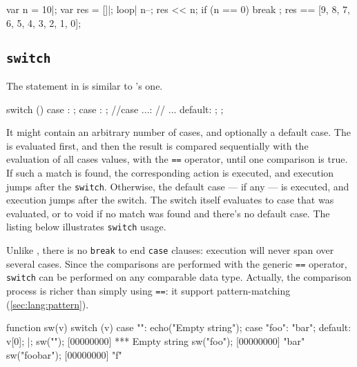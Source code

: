 \begin{urbiassert}
{
  var n = 10|;
  var res = []|;
  loop|
  {
    n--;
    res << n;
    if (n == 0)
      break
  };
  res
}
==
[9, 8, 7, 6, 5, 4, 3, 2, 1, 0];
\end{urbiassert}

\subsection{\lstinline{switch}}
\label{sec:lang:switch}

The  statement in \us is similar to \langC's one.

\begin{urbiunchecked}
switch ()
{
  case :
    ;
  case :
    ;
//case ...:
//  ...
  default:
    ;
};
\end{urbiunchecked}

It might contain an arbitrary number of cases, and optionally a default
case. The  is evaluated first, and then the result is compared
sequentially with the evaluation of all cases values, with the
\lstinline|==| operator, until one comparison is true.  If such a match is
found, the corresponding action is executed, and execution jumps after the
\lstinline{switch}. Otherwise, the default case --- if any --- is executed,
and execution jumps after the switch. The switch itself evaluates to case
that was evaluated, or to void if no match was found and there's no default
case. The listing below illustrates \lstinline{switch} usage.

Unlike \langC, there is no \lstinline{break} to end \lstinline{case} clauses:
execution will never span over several cases.  Since the comparisons are
performed with the generic \lstinline|==| operator, \lstinline{switch} can
be performed on any comparable data type.  Actually, the comparison process
is richer than simply using \lstinline|==|: it support pattern-matching
(\autoref{sec:lang:pattern}).

\begin{urbiscript}
function sw(v)
{
  switch (v)
  {
    case "":
      echo("Empty string");
    case "foo":
      "bar";
    default:
      v[0];
  }
}|;
sw("");
[00000000] *** Empty string
sw("foo");
[00000000] "bar"
sw("foobar");
[00000000] "f"
\end{urbiscript}


